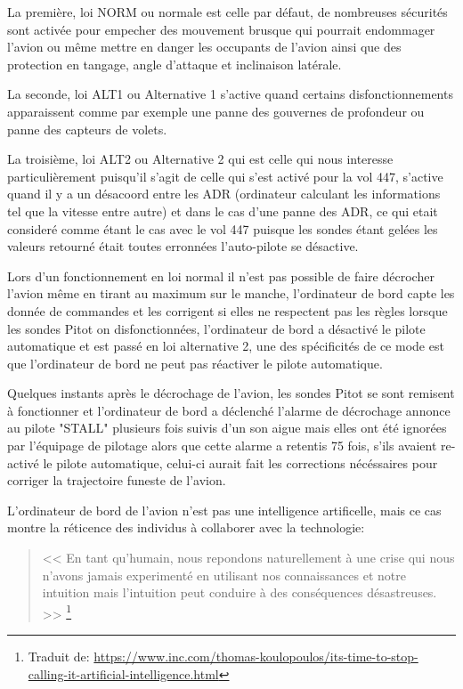         La première, loi NORM ou normale est celle par défaut, de nombreuses sécurités sont activée pour empecher 
        des mouvement brusque qui pourrait endommager l'avion ou même mettre en danger 
        les occupants de l'avion ainsi que des protection en tangage, angle d'attaque et inclinaison 
        latérale. \newline 

        La seconde, loi ALT1 ou Alternative 1 s'active quand certains disfonctionnements apparaissent
        comme par exemple une panne des gouvernes de profondeur ou panne des capteurs de volets.
        \newline

        La troisième, loi ALT2 ou Alternative 2 qui est celle qui nous interesse particulièrement 
        puisqu'il s'agit de celle qui s'est activé pour la vol 447, s'active quand il y a un désacoord
        entre les ADR (ordinateur calculant les informations tel que la vitesse entre autre)
        et dans le cas d'une panne des ADR, ce qui etait consideré comme étant le cas avec 
        le vol 447 puisque les sondes étant gelées les valeurs retourné était toutes erronnées
        l'auto-pilote se désactive. 
        \newline

        Lors d'un fonctionnement en loi normal il n'est pas possible de faire décrocher l'avion 
        même en tirant au maximum sur le manche, l'ordinateur de bord 
        capte les donnée de commandes et les corrigent si elles ne respectent pas les règles 
        lorsque les sondes Pitot on disfonctionnées, l'ordinateur de bord a désactivé le 
        pilote automatique et est passé en loi alternative 2, une des spécificités 
        de ce mode est que l'ordinateur de bord ne peut pas réactiver le pilote automatique.
        \newline 

        Quelques instants après le décrochage de l'avion, les sondes Pitot se sont remisent 
        à fonctionner et l'ordinateur de bord a déclenché l'alarme de décrochage annonce
        au pilote "STALL" plusieurs fois suivis d'un son aigue mais elles ont été 
        ignorées par l'équipage de pilotage alors que cette alarme a retentis 75 fois, 
        s'ils avaient re-activé le pilote automatique, celui-ci aurait fait les
        corrections nécéssaires pour corriger la trajectoire funeste de l'avion. 
        
        L'ordinateur de bord de l'avion n'est pas une intelligence artificelle,
        mais ce cas montre la réticence des individus à collaborer avec la 
        technologie: \newline
        \begin{quote}
            << En tant qu'humain, nous repondons naturellement à une crise qui nous n'avons 
            jamais experimenté en utilisant nos connaissances et notre intuition mais 
            l'intuition peut conduire à des conséquences désastreuses. >> 
            \footnote{Traduit de: \url{https://www.inc.com/thomas-koulopoulos/its-time-to-stop-calling-it-artificial-intelligence.html}}
            \newline 
        \end{quote}

